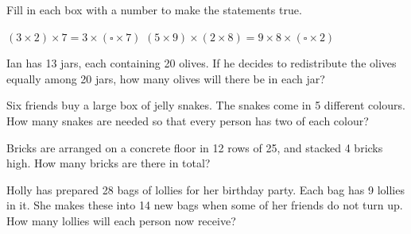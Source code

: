 \begin{exercises}
\begin{questions}
\begin{parts}
        \end{parts}
        \question Fill in each box with a number to make the statements true.
        \begin{parts}
            \Part[1] \((3 \times 2) \times 7=3 \times(\square \times 7)\)
            \Part[1] \((5 \times 9) \times(2 \times 8)=9 \times 8 \times(\square \times 2)\)
        \end{parts}
        \Question[2] Ian has 13 jars, each containing 20 olives. If he decides to redistribute the olives equally among 20 jars, how many olives will there be in each jar?
            \begin{solutionorbox}[1in]
            \end{solutionorbox}
        \Question[2] Six friends buy a large box of jelly snakes. The snakes come in 5 different colours. How many snakes are needed so that every person has two of each colour?
            \begin{solutionorbox}[1in]
            \end{solutionorbox}
        \Question[2] Bricks are arranged on a concrete floor in 12 rows of 25, and stacked 4 bricks high. How many bricks are there in total?
            \begin{solutionorbox}[1in]
            \end{solutionorbox}
        \Question[2] Holly has prepared 28 bags of lollies for her birthday party. Each bag has 9 lollies in it. She makes these into 14 new bags when some of her friends do not turn up. How many lollies will each person now receive?
            \begin{solutionorbox}[1in]
            \end{solutionorbox}
    \end{questions}
\end{exercises}
